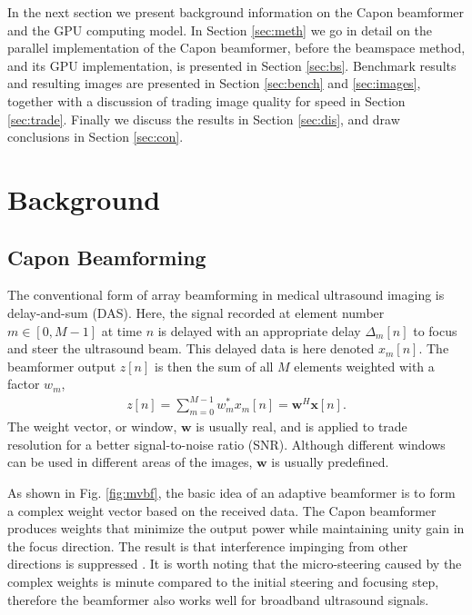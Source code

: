 \documentclass[journal]{IEEEtran}
\renewcommand{\vec}[1]{\mathbf{#1}}
\begin{document}
In the next section we present background information on the Capon beamformer and the GPU computing model. In Section \ref{sec:meth} we go in detail on the parallel implementation of the Capon beamformer, before the beamspace method, and its GPU implementation, is presented in Section \ref{sec:bs}. Benchmark results and resulting images are presented in Section \ref{sec:bench} and \ref{sec:images}, together with a discussion of trading image quality for speed in Section \ref{sec:trade}.  Finally we discuss the results in Section \ref{sec:dis}, and draw conclusions in Section \ref{sec:con}. 

\section{Background}

\subsection{Capon Beamforming}






The conventional form of array beamforming in medical ultrasound imaging is delay-and-sum (DAS). Here, the signal recorded at element number $m \in [0,M-1]$ at time $n$ is delayed with an appropriate delay $\Delta_m[n]$ to focus and steer the ultrasound beam. This delayed data is here denoted $x_m[n]$. The beamformer output $z[n]$ is then the sum of all $M$ elements weighted with a factor $w_m$,
\begin{align}
z[n] = \sum_{m = 0}^{M-1}w_m^*x_m[n] = \vec{w}^H\vec{x}[n]. \label{eq:z}
\end{align}
The weight vector, or window, $\vec{w}$ is usually real, and is applied to trade resolution for a better signal-to-noise ratio (SNR). Although different windows can be used in different areas of the images, $\vec{w}$ is usually predefined.

As shown in Fig. \ref{fig:mvbf}, the basic idea of an adaptive beamformer is to form a complex weight vector based on the received data.   The Capon beamformer produces weights that minimize the output power while maintaining unity gain in the focus direction. The result is that interference impinging from other directions is suppressed \cite{Synnevag2007}. It is worth noting that the micro-steering caused by the complex weights is minute compared to the initial steering and focusing step, therefore the beamformer also works well for broadband ultrasound signals.
\end{document}

